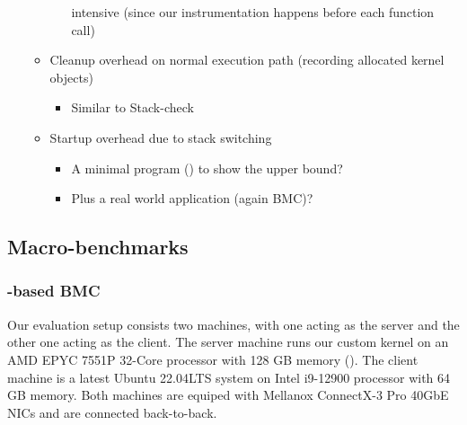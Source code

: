\begin{itemize}
\begin{itemize}
\begin{itemize}
                        intensive (since our instrumentation happens before
                        each function call)
                \end{itemize}
            \item Cleanup overhead on normal execution path (recording
                allocated kernel objects)
                \begin{itemize}
                    \item Similar to Stack-check
                \end{itemize}
            \item Startup overhead due to stack switching
                \begin{itemize}
                    \item A minimal program () to show the upper bound?
                    \item Plus a real world application (again BMC)?
                \end{itemize}
        \end{itemize}
\end{itemize}

\subsection{Macro-benchmarks}
\subsubsection{\projname{}-based BMC}

 Our evaluation setup consists two machines, with one
    acting as the server and the other one acting as the client.
The server machine runs our \projname{} custom kernel on an AMD EPYC 7551P
    32-Core processor with 128 GB memory ().
The client machine is a latest Ubuntu 22.04LTS system on Intel i9-12900
    processor with 64 GB memory.
Both machines are equiped with Mellanox ConnectX-3 Pro 40GbE NICs and are
    connected back-to-back.